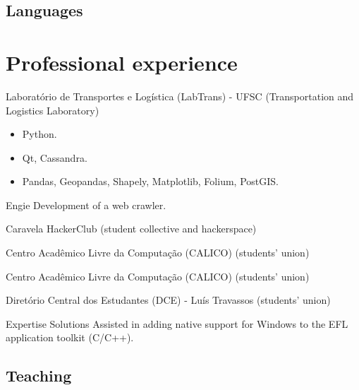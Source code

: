\documentclass[11pt,a4paper]{moderncv}
\begin{document}
    \subsection{Languages}

\newpage

\section{Professional experience}
    {Laboratório de Transportes e Logística (LabTrans) - UFSC}
    {(Transportation and Logistics Laboratory)}{}{
        \begin{itemize}
            \item Python.
            \item Qt, Cassandra.
            \item Pandas, Geopandas, Shapely, Matplotlib, Folium, PostGIS.
        \end{itemize}
    }

    {Engie}
    {}{}{Development of a web crawler.}

    {Caravela HackerClub}
    {(student collective and hackerspace)}{}{}

    {Centro Acadêmico Livre da Computação (CALICO)}
    {(students' union)}{}{}

    {Centro Acadêmico Livre da Computação (CALICO)}
    {(students' union)}{}{}

    {Diretório Central dos Estudantes (DCE) - Luís Travassos}
    {(students' union)}{}{}

    {Expertise Solutions}
    {}{}{Assisted in adding native support for Windows to the EFL application toolkit (C/C++).}

    \subsection{Teaching}
\end{document}
